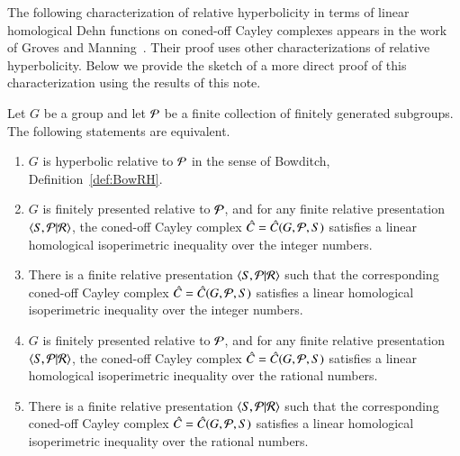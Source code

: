The following characterization of relative hyperbolicity in terms of linear homological Dehn functions on coned-off Cayley complexes appears in the work of Groves and Manning~\cite[Theorem 3.25]{GrMa09}. Their proof uses other characterizations of relative hyperbolicity. Below we provide the sketch of a more direct proof of this characterization using the results of this note. 

\begin{theorem}
Let $G$ be a group and let $\mathcal P$ be a finite collection of finitely generated subgroups. The following statements are equivalent. 
\begin{enumerate}
\item \label{eq1} $G$ is hyperbolic relative to $\mathcal P$ in the sense of Bowditch, Definition~\ref{def:BowRH}.
\item \label{eq2} $G$ is finitely presented relative to $\mathcal P$, and for any finite relative presentation $\langle S, \mathcal P | \mathcal R \rangle$,  the coned-off Cayley complex $\hat C = \hat C(G, \mathcal P, S)$  satisfies a linear homological  isoperimetric inequality over the integer numbers.
\item \label{eq3} There is a finite relative presentation $\langle S, \mathcal P | \mathcal R \rangle$ such that the corresponding coned-off Cayley complex $\hat C = \hat C(G, \mathcal P, S)$  satisfies a linear homological  isoperimetric inequality over the integer  numbers.
\item \label{eq4} $G$ is finitely presented relative to $\mathcal P$, and for any finite relative presentation $\langle S, \mathcal P | \mathcal R \rangle$,  the coned-off Cayley complex $\hat C = \hat C(G, \mathcal P, S)$  satisfies a linear  homological isoperimetric inequality over the rational numbers.
\item \label{eq5} There is a finite relative presentation $\langle S, \mathcal P | \mathcal R \rangle$ such that the corresponding coned-off Cayley complex $\hat C = \hat C(G, \mathcal P, S)$  satisfies a  linear homological isoperimetric inequality over the rational numbers.
\end{enumerate}
\end{theorem} 

